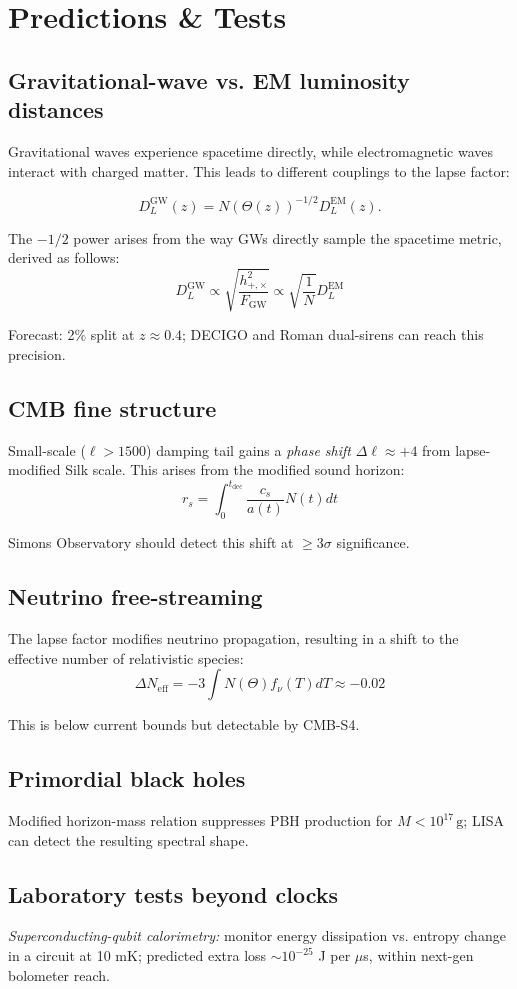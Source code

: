\documentclass[12pt,a4paper]{article}
\newcommand{\sect}[1]{\section{#1}}
\newcommand{\subsect}[1]{\subsection{#1}}
\begin{document}
\sect{Predictions \& Tests}

\subsect{Gravitational-wave vs. EM luminosity distances}

Gravitational waves experience spacetime directly, while electromagnetic waves interact with charged matter. This leads to different couplings to the lapse factor:

\begin{equation}
D_L^{\text{GW}}(z) = N(\Theta(z))^{-1/2} D_L^{\text{EM}}(z).
\end{equation}

The $-1/2$ power arises from the way GWs directly sample the spacetime metric, derived as follows:
\begin{equation}
D_L^{\text{GW}} \propto \sqrt{\frac{h_{+,\times}^2}{F_{\text{GW}}}} \propto \sqrt{\frac{1}{N}} D_L^{\text{EM}}
\end{equation}

Forecast: 2\% split at $z \approx 0.4$; DECIGO and Roman dual-sirens can reach this precision.

\subsect{CMB fine structure}

Small-scale ($\ell > 1500$) damping tail gains a \textit{phase shift} $\Delta\ell \approx +4$ from lapse-modified Silk scale. This arises from the modified sound horizon:
\begin{equation}
r_s = \int_0^{t_\text{dec}} \frac{c_s}{a(t)} N(t) dt
\end{equation}

Simons Observatory should detect this shift at $\geq 3\sigma$ significance.

\subsect{Neutrino free-streaming}

The lapse factor modifies neutrino propagation, resulting in a shift to the effective number of relativistic species:
\begin{equation}
\Delta N_\text{eff} = -3 \int N(\Theta) f_\nu(T) dT \approx -0.02
\end{equation}

This is below current bounds but detectable by CMB-S4.

\subsect{Primordial black holes}

Modified horizon-mass relation suppresses PBH production for $M < 10^{17}\,\text{g}$; LISA can detect the resulting spectral shape.

\subsect{Laboratory tests beyond clocks}

\textit{Superconducting-qubit calorimetry:} monitor energy dissipation vs. entropy change in a circuit at 10 mK; predicted extra loss $\sim 10^{-25}$ J per $\mu$s, within next-gen bolometer reach.
\end{document}
